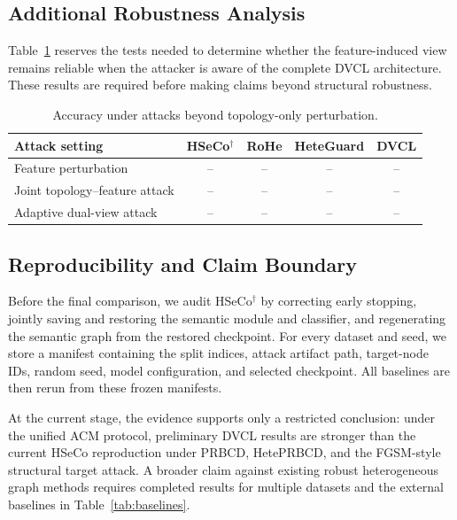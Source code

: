 \FloatBarrier
\subsection{Additional Robustness Analysis}

Table~\ref{tab:adaptive_attack} reserves the tests needed to determine whether the feature-induced view remains reliable when the attacker is aware of the complete DVCL architecture. These results are required before making claims beyond structural robustness.

\begin{table}[htbp]
\centering
\small
\caption{Accuracy under attacks beyond topology-only perturbation.}
\label{tab:adaptive_attack}
\begin{tabular}{lcccc}
\toprule
Attack setting & HSeCo$^{\dagger}$ & RoHe & HeteGuard & DVCL \\
\midrule
Feature perturbation & -- & -- & -- & -- \\
Joint topology--feature attack & -- & -- & -- & -- \\
Adaptive dual-view attack & -- & -- & -- & -- \\
\bottomrule
\end{tabular}
\end{table}

\FloatBarrier
\subsection{Reproducibility and Claim Boundary}

Before the final comparison, we audit HSeCo$^{\dagger}$ by correcting early stopping, jointly saving and restoring the semantic module and classifier, and regenerating the semantic graph from the restored checkpoint. For every dataset and seed, we store a manifest containing the split indices, attack artifact path, target-node IDs, random seed, model configuration, and selected checkpoint. All baselines are then rerun from these frozen manifests.

At the current stage, the evidence supports only a restricted conclusion: under the unified ACM protocol, preliminary DVCL results are stronger than the current HSeCo reproduction under PRBCD, HetePRBCD, and the FGSM-style structural target attack. A broader claim against existing robust heterogeneous graph methods requires completed results for multiple datasets and the external baselines in Table~\ref{tab:baselines}.

\FloatBarrier
